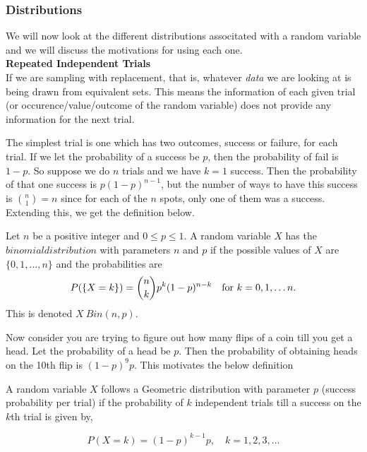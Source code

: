 \documentclass[../main.tex]{subfiles}
\begin{document}
\subsubsection{Distributions}
We will now look at the different distributions associtated with a random variable
and we will discuss the motivations for using each one.\\
\textbf{Repeated Independent Trials}\\
If we are sampling with replacement, that is, whatever \textit{data} we are 
looking at is being drawn from equivalent sets. This means the information
of each given trial (or occurence/value/outcome of the random variable) does not provide
any information for the next trial.
\par The simplest trial is one which has two outcomes, success or failure, for each trial. If we let the 
probability of a success be $p$, then the probability of fail is $1-p$. So suppose we do $n$ trials
and we have $k=1$ success. Then the probability of that one success is $p(1-p)^{n-1}$, but the 
number of ways to have this success is $\binom{n}{1} = n$ since for each of the $n$ spots, only 
one of them was a success. Extending this, we get the definition below. 



\begin{definition}
Let $n$ be a positive integer and $ 0 \leq p \leq 1$. A random variable $X$ has the $binomial distribution$ with parameters
$n$ and $p$ if the possible values of $X$ are $\{0,1,\dots,n\}$ and the probabilities are 
\[
P(\{X=k\}) = \binom{n}{k}p^k(1-p)^{n-k} \quad \textnormal{for } k = 0,1,\dots n.
\]
This is denoted $X ~ Bin(n,p)$.
    
\end{definition}


\par Now consider you are trying to figure out how many flips of a coin 
till you get a head. Let the probability of a head be $p$. Then the probability 
of obtaining heads on the 10th flip is $(1-p)^{9}p$. This motivates the below definition


\begin{definition}
A random variable \( X \) follows a Geometric distribution with parameter \( p \) (success probability per trial) if the probability of $k$ independent trials till a success on the $k$th trial is given by,

\[
P(X = k) = (1 - p)^{k-1} p, \quad k = 1, 2, 3, \dots
\]
\end{definition}
\end{document}
